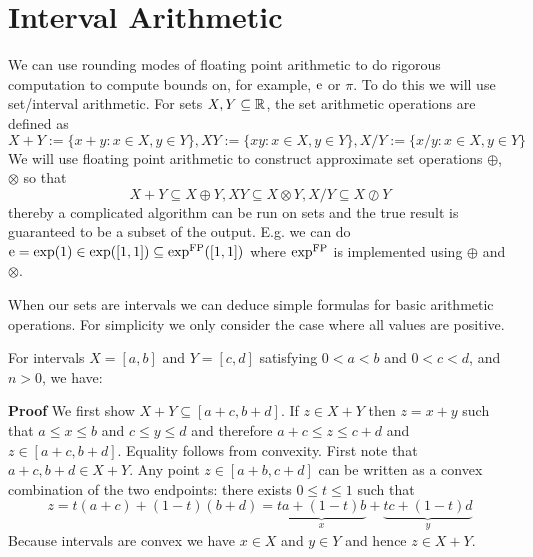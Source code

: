 
\section{Interval Arithmetic}
We can use rounding modes of floating point arithmetic to do rigorous computation to compute bounds on, for example, ${\rm e}$ or $\ensuremath{\pi}$. To do this we will use set/interval arithmetic. For sets $X,Y \subseteq {\mathbb R}$, the set arithmetic operations are defined as
\[
X + Y := \{x + y : x \ensuremath{\in} X, y \ensuremath{\in} Y\}, XY := \{xy : x \ensuremath{\in} X, y \ensuremath{\in} Y\}, X/Y := \{x/y : x \ensuremath{\in} X, y \ensuremath{\in} Y\}
\]
We will use floating point arithmetic to construct approximate set operations \ensuremath{\oplus}, \ensuremath{\otimes} so that
\[
  X + Y \ensuremath{\subseteq} X \ensuremath{\oplus} Y, XY \ensuremath{\subseteq} X \ensuremath{\otimes} Y, X/Y \ensuremath{\subseteq} X \ensuremath{\oslash} Y
\]
thereby a complicated algorithm can be run on sets and the true result is guaranteed to be a subset of the output. E.g. we can do ${\rm e} = {\rm exp}(1) \in {\rm exp}([1,1]) \subseteq {\rm exp}^{\rm FP}([1,1])$ where ${\rm exp}^{\rm FP}$ is implemented using $\ensuremath{\oplus}$ and $\ensuremath{\otimes}$.

When our sets are intervals we can deduce simple formulas for basic arithmetic operations. For simplicity we only consider the case where all values are positive.

\begin{proposition} For intervals  $X = [a,b]$ and $Y = [c,d]$ satisfying $0 < a < b$ and $0 < c < d$, and $n > 0$, we have:
\end{proposition}
\textbf{Proof} We first show $X+Y \ensuremath{\subseteq} [a+c,b+d]$. If $z \ensuremath{\in} X + Y$ then $z = x+y$ such that $a \ensuremath{\leq} x \ensuremath{\leq} b$ and $c \ensuremath{\leq} y \ensuremath{\leq} d$ and therefore $a + c \ensuremath{\leq} z \ensuremath{\leq} c + d$ and $z \ensuremath{\in} [a+c,b+d]$. Equality follows from convexity. First note that $a+c, b+d \ensuremath{\in} X+Y$. Any point $z \ensuremath{\in}  [a+b,c+d]$ can be written  as a convex combination of the two endpoints: there exists $0 \ensuremath{\leq} t \ensuremath{\leq} 1$ such that
\[
z = t (a+c) + (1-t) (b+d) =  \underbrace{t a + (1-t) b}_x + \underbrace{t c + (1-t) d}_y
\]
Because intervals are convex we have $x \ensuremath{\in} X$ and $y \ensuremath{\in} Y$ and hence $z \ensuremath{\in} X+Y$. 

